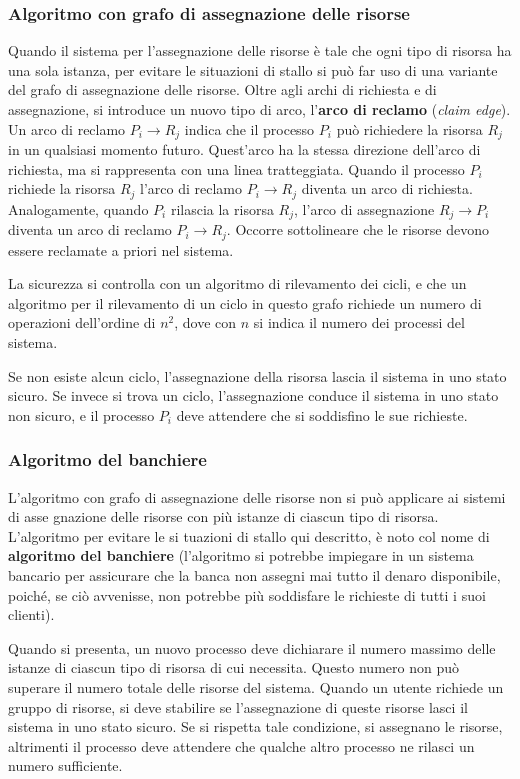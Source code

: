 \documentclass[11pt,a4paper]{article}
\begin{document}
\subsubsection{Algoritmo con grafo di assegnazione delle risorse}
Quando il sistema per l'assegnazione delle risorse è tale che ogni tipo di risorsa ha una sola
istanza, per evitare le situazioni di stallo si può far uso di una variante del grafo di assegna­zione delle risorse. Oltre agli archi di richiesta e di assegnazione,
si introduce un nuovo tipo di arco, l'\textbf{arco di reclamo} (\emph{claim edge}). Un arco di reclamo
$P_i\rightarrow R_j$ indica che il processo $P_i$ può richiedere la risorsa $R_j$ in un qualsiasi momento futu­ro. Quest'arco ha la stessa direzione dell'arco di richiesta, ma si rappresenta con una linea
tratteggiata. Quando il processo $P_i$ richiede la risorsa $R_j$ l'arco di reclamo $P_i \rightarrow R_j$ diventa un
arco di richiesta. Analogamente, quando $P_i$ rilascia la risorsa $R_j$, l'arco di assegnazione
$R_j \rightarrow P_i$ diventa un arco di reclamo $P_i \rightarrow R_j$. Occorre sottolineare che le risorse devono esse­re reclamate a priori nel sistema.

La sicurezza si controlla con un algoritmo di rilevamento dei cicli, e che un algoritmo per il rileva­mento di un ciclo in questo grafo richiede un numero di operazioni dell'ordine di $n^2$, dove
con $n$ si indica il numero dei processi del sistema.

Se non esiste alcun ciclo, l'assegnazione della risorsa lascia il sistema in uno stato sicuro. Se
invece si trova un ciclo, l'assegnazione conduce il sistema in uno stato non sicuro, e il pro­cesso $P_i$ deve attendere che si soddisfino le sue richieste.

\subsubsection{Algoritmo del banchiere}
L'algoritmo con grafo di assegnazione delle risorse non si può applicare ai sistemi di asse­
gnazione delle risorse con più istanze di ciascun tipo di risorsa. L'algoritmo per evitare le si­
tuazioni di stallo qui descritto, è noto col nome di \textbf{algoritmo del
banchiere} (l'algoritmo si potrebbe impiegare in un siste­ma bancario per assicurare che la banca non assegni mai tutto il denaro disponibile, poiché,
se ciò avvenisse, non potrebbe più soddisfare le richieste di tutti i suoi clienti).

Quando si presenta, un nuovo processo deve dichiarare il numero massimo delle istan­ze di ciascun tipo di risorsa di cui necessita. Questo numero non può superare il numero to­tale delle risorse del sistema. Quando un utente richiede un gruppo di risorse, si deve stabi­lire se l'assegnazione di queste risorse lasci il sistema in uno stato sicuro. Se si rispetta tale
condizione, si assegnano le risorse, altrimenti il processo deve attendere che qualche altro
processo ne rilasci un numero sufficiente.
\end{document}
